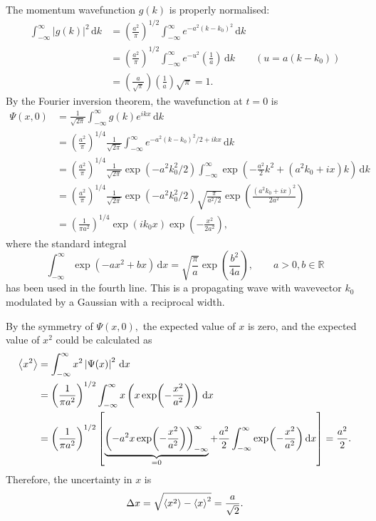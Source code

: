\documentclass{article}
\begin{document}
The momentum wavefunction $g(k)$ is properly normalised: 
\begin{align*}
    \int_{-\infty}^{\infty} \left\vert g(k) \right\vert ^{2}  \,\mathrm{d}k 
    &= \left( \frac{a^{2} }{\pi }\right)^{1 /2}\int_{-\infty}^{\infty} e^{-a^{2} (k-k_0)^{2} } \,\mathrm{d}k \\ 
    &= \left( \frac{a^{2} }{\pi }\right)^{1 /2}\int_{-\infty}^{\infty} e^{-u^{2} } \left( \frac{1}{a}\right) \,\mathrm{d}k
    \qquad (u = a(k-k_0)) \\ 
    &= \left( \frac{a}{\sqrt{\pi } }\right) \left(\frac{1}{a}\right) \sqrt{\pi } = 1. 
\end{align*}
By the Fourier inversion theorem, the wavefunction at $t=0$ is 
\begin{align*}  
    \Psi(x,0)  
    &= \frac{1}{\sqrt{2\pi } }\int_{-\infty}^{\infty} g(k) e^{i k x} \,\mathrm{d}k \\
    &= \left(\frac{a^{2} }{\pi }\right)^{1/ 4} \frac{1}{\sqrt{2\pi } }\int_{-\infty}^{\infty} e^{-a^{2} (k-k_0)^{2} /2 + ikx} \,\mathrm{d}k \\ 
    &= \left(\frac{a^{2} }{\pi }\right)^{1/ 4} \frac{1}{\sqrt{2\pi } }\exp(-a^{2} k_0 ^{2} /2) \int_{-\infty}^{\infty} \exp(-\frac{a^{2}}{2} k^{2}  + (a^{2} k_0+ix)k) \,\mathrm{d}k \\ 
    &= \left(\frac{a^{2} }{\pi }\right)^{1/ 4} \frac{1}{\sqrt{2\pi } }\exp(-a^{2} k_0 ^{2} /2) 
    \sqrt{\frac{\pi }{a^{2} /2}} \exp( \frac{(a^{2} k_0 + ix)^{2} }{2a^{2} } ) \\
    &= \left( \frac{1}{\pi a^{2} }\right)^{1 /4} \exp(ik_0 x) \exp(-\frac{x^{2} }{2a^{2} }),
\end{align*} 
where the standard integral 
\[
    \int_{-\infty}^{\infty} \exp(-ax^{2} +bx) \,\mathrm{d}x  = \sqrt{\frac{\pi }{a}} \exp(\frac{b^{2} }{4a}), \qquad a>0, b \in \mathbb{R}
\]
has been used in the fourth line. 
This is a propagating wave with wavevector $k_0$ modulated by a Gaussian with a reciprocal width. 

By the symmetry of $\Psi(x,0),$ the expected value of $x$ is zero, and the expected value of $x^{2} $ could be calculated as 
\begin{align*}
    \expval{x^{2} } 
    &= \int_{-\infty}^{\infty} x^{2} \left\vert \Psi(x) \right\vert ^{2}  \,\mathrm{d}x  \\ 
    &= \left( \frac{1}{\pi a^{2} }\right)^{1 /2} \int_{-\infty}^{\infty} x \left( x\exp(-\frac{x^{2} }{a^{2} }) \right) \,\mathrm{d}x \\
    &= \left( \frac{1}{\pi a^{2} }\right)^{1 /2} \left[ \underbrace{\left( -a^{2} x \exp(-\frac{x^{2}}{a^{2} })\right)^{\infty}_{-\infty}}_{=0} +\frac{a^{2}}{2} \int_{-\infty}^{\infty}  \exp(-\frac{x^{2}}{a^{2} })\,\mathrm{d}x   \right]
    = \frac{a^{2} }{2}. 
\end{align*}
Therefore, the uncertainty in $x$ is 
\[
    \Delta x = \sqrt{ \expval{x^2} - \expval{x}^2} = \frac{a}{\sqrt{2} }.
\]

\end{document}
